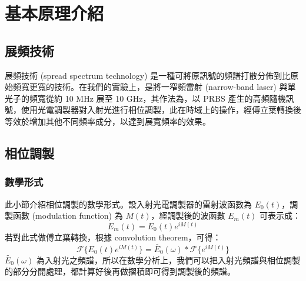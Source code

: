 \documentclass[class=NCU_thesis, crop=false]{standalone}
\begin{document}
\chapter{基本原理介紹}

\section{展頻技術}

展頻技術 (spread spectrum technology) 是一種可將原訊號的頻譜打散分佈到比原始頻寬更寬的技術。在我們的實驗上，是將一窄頻雷射 (narrow-band laser) 與單光子的頻寬從約 10 MHz 展至 10 GHz，其作法為，以 PRBS 產生的高頻隨機訊號，使用光電調製器對入射光進行相位調製，此在時域上的操作，經傅立葉轉換後等效於增加其他不同頻率成分，以達到展寬頻率的效果。
\section{相位調製}

\subsection{數學形式}
此小節介紹相位調製的數學形式。設入射光電調製器的雷射波函數為 $E_{0}(t)$，調製函數 (modulation function) 為 $M(t)$，經調製後的波函數 $E_{m}(t)$ 可表示成：
\begin{equation}
    E_{m}(t)=E_{0}(t)e^{iM(t)}
\end{equation}
若對此式做傅立葉轉換，根據 convolution theorem，可得：
\begin{equation}
\label{eq:modulation_function}
    \mathscr{F}\{E_{0}(t)e^{iM(t)}\}=\tilde{E_{0}}(\omega)*\mathscr{F}\{{e^{iM(t)}}\}
\end{equation}
$\tilde{E_{0}}(\omega)$ 為入射光之頻譜，所以在數學分析上，我們可以把入射光頻譜與相位調製的部分分開處理，都計算好後再做摺積即可得到調製後的頻譜。
\end{document}

